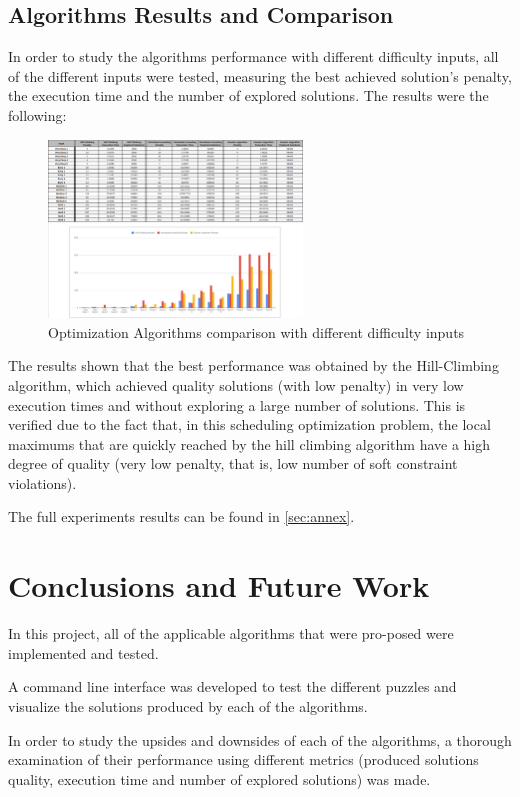 \documentclass[conference]{IEEEtran}
\begin{document}
\subsection{Algorithms Results and Comparison}

In order to study the algorithms performance with different difficulty inputs, all of the different inputs were tested, measuring the best achieved solution's penalty, the execution time and the number of explored solutions. The results were the following:  

\begin{figure}[H]
    \centerline{\includegraphics[width=255px]{comparison.png}}
    \caption{Optimization Algorithms comparison with different difficulty inputs}
\end{figure}

The results shown that the best performance was obtained by the Hill-Climbing algorithm, which achieved quality solutions (with low penalty) in very low execution times and without exploring a large number of solutions. This is verified due to the fact that, in this scheduling optimization problem, the local maximums that are quickly reached by the hill climbing algorithm have a high degree of quality (very low penalty, that is, low number of soft constraint violations). 

The full experiments results can be found in \autoref{sec:annex}.

\section{Conclusions and Future Work}

In this project, all of the applicable algorithms that were pro-posed were implemented and tested.

A command line interface was developed to test the different puzzles and visualize the solutions produced by each of the algorithms.

In order to study the upsides and downsides of each of the algorithms, a thorough examination of their performance using different metrics (produced solutions quality, execution time and number of explored solutions) was made. 
\end{document}

